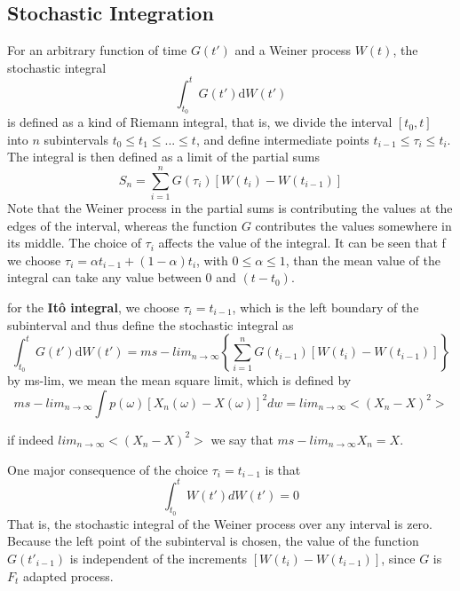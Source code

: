 \documentclass[12pt]{paper}
\begin{document}
\subsection{Stochastic Integration}
For an arbitrary function of time $G(t')$ and a Weiner process $W(t)$, the stochastic integral 
\begin{equation*}
\int_{t_0}^t G(t')\mathrm{d}W(t')
\end{equation*}
is defined as a kind of Riemann integral, that is, we divide the interval $[t_0,t]$ into $n$ subintervals $t_0\leq t_1\leq ...\leq t$, and define intermediate points $t_{i-1}\leq\tau_i\leq t_{i}$. The integral is then defined as a limit of the partial sums 
\begin{equation*}
S_n=\sum_{i=1}^nG(\tau_i)[W(t_i)-W(t_{i-1})]
\end{equation*}
Note that the Weiner process in the partial sums is contributing the values at the edges of the interval, whereas the function $G$ contributes the values somewhere in its middle.
The choice of $\tau_i$ affects the value of the integral. It can be seen that f we choose $\tau_i=\alpha t_{i-1}+(1-\alpha)t_i$, with $0\leq \alpha\leq 1$,  than the mean value of the integral can take any value between 0 and $(t-t_0)$. 

for the \textbf{It\^{o} integral}, we choose $\tau_i=t_{i-1}$, which is the left boundary of the subinterval and thus define the stochastic integral as
\begin{equation*}
\int_{t_0}^{t}G(t')\mathrm{d}W(t')=ms-lim_{n\rightarrow\infty}\left\{\sum_{i=1}^nG(t_{i-1})[W(t_{i})-W(t_{i-1})] \right\}
\end{equation*}
by ms-lim, we mean the mean square limit, which is defined by 
\begin{equation*}
ms-lim_{n\rightarrow\infty}\int p(\omega)[X_n(\omega)-X(\omega)]^2dw= lim_{n\rightarrow \infty}<(X_n-X)^2>
\end{equation*}

if indeed $lim_{n\rightarrow \infty}<(X_n-X)^2>$ we say that $ms-lim_{n\rightarrow \infty} X_n=X$.

One major consequence of the choice $\tau_i=t_{i-1}$ is that 
\begin{equation*}
\int_{t_0}^{t}W(t')dW(t')=0
\end{equation*}
That is, the stochastic integral of the Weiner process over any interval is zero.
Because the left point of the subinterval is chosen, the value of the function $G(t'_{i-1})$ is independent of the increments $[W(t_i)-W(t_{i-1})]$, since $G$ is $F_t$ adapted process.
\end{document}
